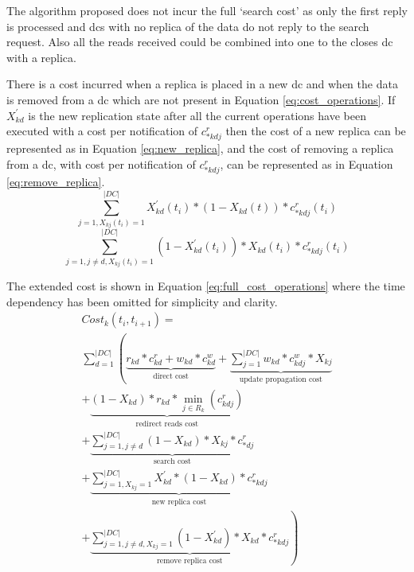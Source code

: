 \documentclass{acm_proc_article-sp}
\begin{document}
The algorithm proposed does not incur the full `search cost' as only the first reply is processed and \glspl{dc} with no replica of the data do not reply to the search request. Also all the reads received could be combined into one to the closes \gls{dc} with a replica.

There is a cost incurred when a replica is placed in a new \gls{dc} and when the data is removed from a \gls{dc} which are not present in Equation \ref{eq:cost_operations}. If $X^{'}_{kd}$ is the new replication state after all the current operations have been executed with a cost per notification of $c^{r}_{*kdj}$ then the cost of a new replica can be represented as in Equation \ref{eq:new_replica}, and the cost of removing a replica from a \gls{dc}, with cost per notification of $c^{r}_{*kdj}$, can be represented as in Equation \ref{eq:remove_replica}.
\begin{equation} \label{eq:new_replica}
	\sum^{|DC|}_{j = 1, X_{kj}(t_{i}) = 1} X^{'}_{kd}(t_{i}) * (1 - X_{kd}(t)) * c^{r}_{*kdj}(t_{i})
\end{equation}
\begin{equation} \label{eq:remove_replica}
	\sum^{|DC|}_{j = 1, j \neq d, X_{kj}(t_{i}) = 1} (1 - X^{'}_{kd}(t_{i})) * X_{kd}(t_{i}) * c^{r}_{*kdj}(t_{i})
\end{equation}

The extended cost is shown in Equation \ref{eq:full_cost_operations} where the time dependency has been omitted for simplicity and clarity.
\begin{equation} \label{eq:full_cost_operations}
	\begin{split}
		Cost_{k}(t_{i}, t_{i+1}) =\\
		 \sum^{|DC|}_{d = 1} \left( \underbrace{r_{kd} * c^{r}_{kd} + w_{kd} * c^{w}_{kd}}_\text{direct cost} + \underbrace{\sum^{|DC|}_{j = 1} w_{kd} * c^{w}_{kdj} * X_{kj}}_\text{update propagation cost} \right. \\ 
		\left. + \underbrace{(1 - X_{kd}) * r_{kd} * \min_{j \in R_{k}}(c^{r}_{kdj})}_\text{redirect reads cost} \right. \\ 
		\left. + \underbrace{\sum^{|DC|}_{j = 1, j \neq d}  (1 - X_{kd}) * X_{kj} * c^{r}_{*dj}}_\text{search cost} \right. \\
		\left. + \underbrace{\sum^{|DC|}_{j = 1, X_{kj} = 1} X^{'}_{kd} * (1 - X_{kd}) * c^{r}_{*kdj}}_\text{new replica cost} \right. \\ 
		\left. + \underbrace{\sum^{|DC|}_{j = 1, j \neq d, X_{kj} = 1} (1 - X^{'}_{kd}) * X_{kd} * c^{r}_{*kdj}}_\text{remove replica cost} \right)
	\end{split}
\end{equation}
\end{document}
